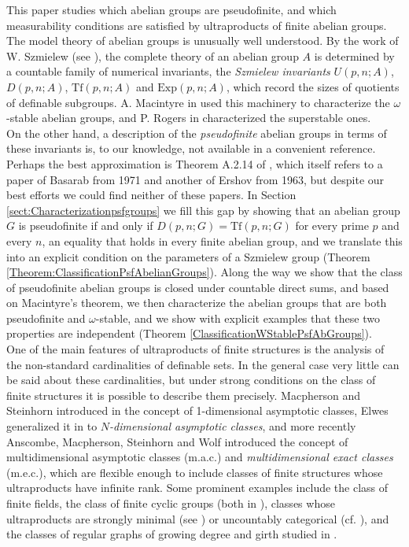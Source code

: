 \documentclass[10pt,a4paper]{amsart}
\theoremstyle{definition}
\begin{document}
This paper studies which abelian groups are pseudofinite, and which measurability conditions
are satisfied by ultraproducts of finite abelian groups. The model theory of abelian groups is unusually well understood. By the
work of W. Szmielew (see \cite[Appendix A.2]{Hodges-ModelTheory}), the complete theory of an abelian group $A$ is determined by a countable
family of numerical invariants, the \emph{Szmielew invariants}
$U(p,n;A)$, $D(p,n;A)$, $\mathrm{Tf}(p,n;A)$ and $\mathrm{Exp}(p,n;A)$, which
record the sizes of quotients of definable subgroups. A. Macintyre in \cite{Macintyre1971} used this machinery to characterize the $\omega$-stable
abelian groups, and P. Rogers in \cite{PhD-PatriciaRogers} characterized the superstable
ones.\\

On the other hand, a description of the \emph{pseudofinite} abelian
groups in terms of these invariants is, to our knowledge, not available in
a convenient reference. Perhaps the best approximation is Theorem A.2.14 of \cite{Hodges-ModelTheory}, which itself refers to a paper of Basarab from 1971 and another of Ershov from 1963, but despite our best efforts we could find neither of these papers. In
Section \ref{sect:Characterizationpsfgroups} we fill this gap by showing that an abelian group $G$ is
pseudofinite if and only if $D(p,n;G)=\mathrm{Tf}(p,n;G)$ for every prime $p$ and every $n$, an equality that holds in every finite abelian group, and we
translate this into an explicit condition on the parameters of a Szmielew
group (Theorem \ref{Theorem:ClassificationPsfAbelianGroups}). Along the way we show that the
class of pseudofinite abelian groups is closed under countable direct sums, and based on  Macintyre's theorem, we
then characterize the abelian groups that are both pseudofinite and
$\omega$-stable, and we show with explicit examples that these two properties
are independent (Theorem \ref{ClassificationWStablePsfAbGroups}).\\

One of the main features of ultraproducts of finite structures is the
analysis of the non-standard cardinalities of definable sets. In the
general case very little can be said about these cardinalities, but under strong
conditions on the class of finite structures it is possible to describe
them precisely. Macpherson and Steinhorn introduced in \cite{Macpherson-Steinhorn}  the concept of 1-dimensional asymptotic classes, Elwes generalized it in \cite{Elwes-AsymptoticClasses} to
\emph{$N$-dimensional asymptotic classes}, and more recently Anscombe, Macpherson, Steinhorn and
Wolf \cite{AMSW} introduced the concept of multidimensional asymptotic classes (m.a.c.) and \emph{multidimensional exact
classes} (m.e.c.), which are flexible enough to include classes of finite structures whose
ultraproducts have infinite rank. Some prominent examples include the class of
finite fields, the class of finite cyclic groups (both in \cite{Macpherson-Steinhorn}), classes whose ultraproducts are strongly minimal (see \cite{Pillay-stronglyminimalpsf}) or uncountably
categorical (cf. \cite{vanAbel-counting}), and the classes of regular graphs of growing
degree and girth studied in \cite{Garcia-Robles}.\\
\end{document}
